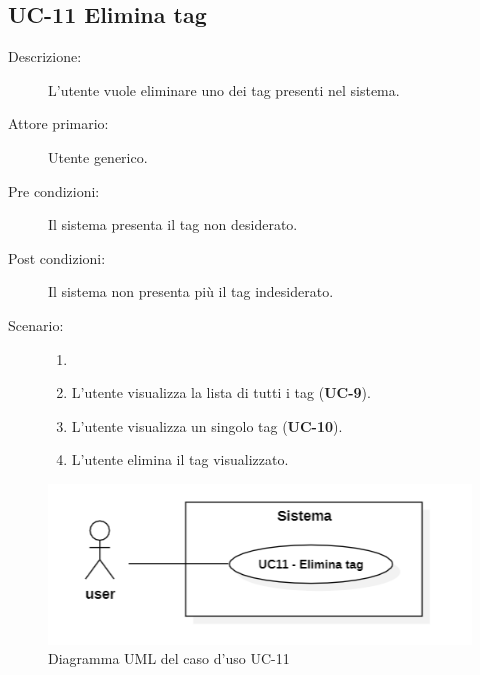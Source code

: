 \subsection{UC-11 Elimina tag}
\begin{description}
    \item[Descrizione:] L'utente vuole eliminare uno dei tag presenti nel sistema.
    \item[Attore primario:] Utente generico.
    \item[Pre condizioni:] Il sistema presenta il tag non desiderato.
    \item[Post condizioni:] Il sistema non presenta più il tag indesiderato.
    \item[Scenario:]
    \begin{enumerate}
        \item[]
        \item L’utente visualizza la lista di tutti i tag (\textbf{UC-9}).
        \item L'utente visualizza un singolo tag (\textbf{UC-10}).
        \item L'utente elimina il tag visualizzato.
    \end{enumerate}
\end{description}

\begin{figure}[H]
    \centering
    \includegraphics[width=0.8\linewidth]{UC11.PNG} 
    \caption{Diagramma UML del caso d'uso UC-11}
    \label{fig:UC11}
\end{figure}

